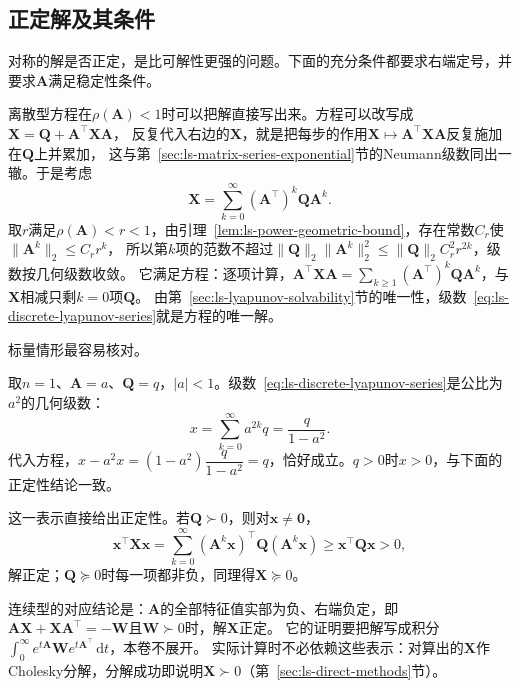 \subsection{正定解及其条件}
\label{sec:ls-lyapunov-positivity}

对称的解是否正定，是比可解性更强的问题。下面的充分条件都要求右端定号，并要求$\bm A$满足稳定性条件。

离散型方程在$\rho(\bm A)<1$时可以把解直接写出来。方程可以改写成$\bm X=\bm Q+\bm A^\top\bm X\bm A$，
反复代入右边的$\bm X$，就是把每步的作用$\bm X\mapsto\bm A^\top\bm X\bm A$反复施加在$\bm Q$上并累加，
这与第~\ref{sec:ls-matrix-series-exponential}节的Neumann级数同出一辙。于是考虑
\begin{equation}
 \bm X=\sum_{k=0}^{\infty}(\bm A^{\top})^k\bm Q\bm A^k .
 \label{eq:ls-discrete-lyapunov-series}
\end{equation}
取$r$满足$\rho(\bm A)<r<1$，由引理~\ref{lem:ls-power-geometric-bound}，存在常数$C_r$使$\lVert\bm A^k\rVert_2\leq C_rr^k$，
所以第$k$项的范数不超过$\lVert\bm Q\rVert_2\lVert\bm A^k\rVert_2^2\leq\lVert\bm Q\rVert_2C_r^2r^{2k}$，级数按几何级数收敛。
它满足方程：逐项计算，$\bm A^\top\bm X\bm A=\sum_{k\geq1}(\bm A^\top)^k\bm Q\bm A^k$，与$\bm X$相减只剩$k=0$项$\bm Q$。
由第~\ref{sec:ls-lyapunov-solvability}节的唯一性，级数~\eqref{eq:ls-discrete-lyapunov-series}就是方程的唯一解。

标量情形最容易核对。

\begin{example}[标量离散Lyapunov方程]
\label{ex:ls-scalar-discrete-lyapunov}
取$n=1$、$\bm A=a$、$\bm Q=q$，$|a|<1$。级数~\eqref{eq:ls-discrete-lyapunov-series}是公比为$a^2$的几何级数：
\[
 x=\sum_{k=0}^{\infty}a^{2k}q=\frac{q}{1-a^2}.
\]
代入方程，$x-a^2x=(1-a^2)\dfrac{q}{1-a^2}=q$，恰好成立。$q>0$时$x>0$，与下面的正定性结论一致。
\end{example}

这一表示直接给出正定性。若$\bm Q\succ0$，则对$\bm x\neq\bm0$，
\[
 \bm x^\top\bm X\bm x=\sum_{k=0}^{\infty}(\bm A^k\bm x)^\top\bm Q(\bm A^k\bm x)\geq\bm x^\top\bm Q\bm x>0 ,
\]
解正定；$\bm Q\succeq0$时每一项都非负，同理得$\bm X\succeq0$。

连续型的对应结论是：$\bm A$的全部特征值实部为负、右端负定，即$\bm A\bm X+\bm X\bm A^\top=-\bm W$且$\bm W\succ0$时，解$\bm X$正定。
它的证明要把解写成积分$\int_0^\infty e^{t\bm A}\bm W e^{t\bm A^\top}\,\mathrm dt$，本卷不展开。
实际计算时不必依赖这些表示：对算出的$\bm X$作Cholesky分解，分解成功即说明$\bm X\succ0$（第~\ref{sec:ls-direct-methods}节）。

